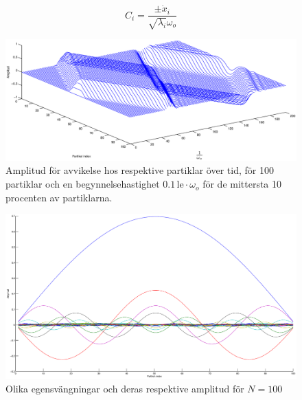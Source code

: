 \documentclass[12pt,a4paper]{article}
\newcommand{\captiona}[1]{\caption{\scriptsize{#1}}}
\begin{document}
		\begin{equation*}
			C_i = \frac{\pm \dot{x}_i}{\sqrt{\lambda_i} \omega_o}
		\end{equation*}
		
		\begin{figure}[h]
			\includegraphics[width=1\textwidth]{oscillations-over-time.eps}
			\captiona{Amplitud för avvikelse hos respektive partiklar över tid, för 100 partiklar och en
			begynnelsehastighet $0.1 \, \mathrm{le} \cdot \omega_o$ för de mittersta 10 procenten av partiklarna.}
			\label{oscot}
		\end{figure}
		
		\begin{figure}[h]
			\includegraphics[width=1\textwidth]{vaagformer.eps}
			\captiona{Olika egensvängningar och deras respektive amplitud för $N=100$}
			\label{waves}
		\end{figure}
	
	\clearpage
	
\end{document}
